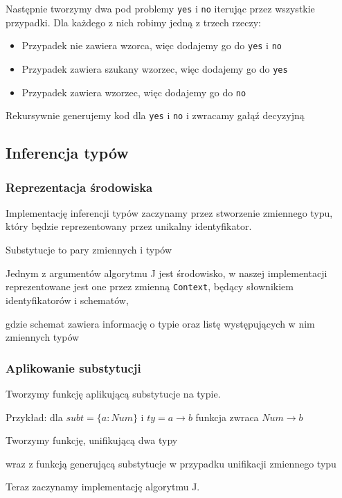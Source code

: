 \documentclass{article}
\begin{document}
Następnie tworzymy dwa pod problemy \lstinline{yes} i \lstinline{no} iterując przez wszystkie przypadki. Dla każdego z nich robimy jedną z trzech rzeczy:
\begin{itemize}
  \item Przypadek nie zawiera wzorca, więc dodajemy go do \lstinline{yes} i \lstinline{no}
        
  \item Przypadek zawiera szukany wzorzec, więc dodajemy go do \lstinline{yes}
        
  \item Przypadek zawiera wzorzec, więc dodajemy go do \lstinline{no}
        
\end{itemize}

Rekursywnie generujemy kod dla \lstinline{yes} i \lstinline{no} i zwracamy gałąź decyzyjną

\subsection{Inferencja typów}
\subsubsection{Reprezentacja środowiska}
Implementację inferencji typów zaczynamy przez stworzenie zmiennego typu, który będzie reprezentowany przez unikalny identyfikator.

Substytucje to pary zmiennych i typów

Jednym z argumentów algorytmu J jest środowisko, w naszej implementacji reprezentowane jest one przez zmienną \lstinline$Context$, będący słownikiem identyfikatorów i schematów,

gdzie schemat zawiera informację o typie oraz listę występujących w nim zmiennych typów


\subsubsection{Aplikowanie substytucji}
Tworzymy funkcję aplikującą substytucje na typie.

Przykład: dla $subt=\{a:Num\}$ i $ty=a\rightarrow b$ funkcja zwraca $Num\rightarrow b$

Tworzymy funkcję, unifikującą dwa typy

wraz z funkcją generującą substytucje w przypadku unifikacji zmiennego typu

Teraz zaczynamy implementację algorytmu J.
\end{document}
